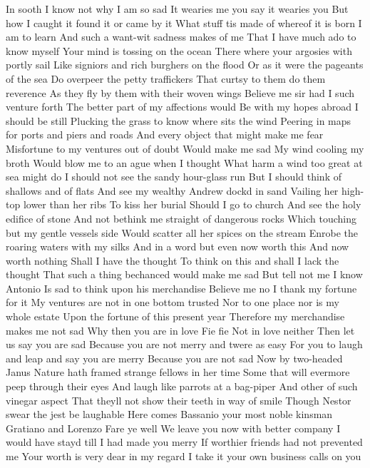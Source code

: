 In sooth I know not why I am so sad 
It wearies me you say it wearies you 
But how I caught it found it or came by it 
What stuff tis made of whereof it is born 
I am to learn 
And such a want-wit sadness makes of me 
That I have much ado to know myself 
Your mind is tossing on the ocean 
There where your argosies with portly sail 
Like signiors and rich burghers on the flood 
Or as it were the pageants of the sea 
Do overpeer the petty traffickers 
That curtsy to them do them reverence 
As they fly by them with their woven wings 
Believe me sir had I such venture forth 
The better part of my affections would 
Be with my hopes abroad I should be still 
Plucking the grass to know where sits the wind 
Peering in maps for ports and piers and roads 
And every object that might make me fear 
Misfortune to my ventures out of doubt 
Would make me sad 
My wind cooling my broth 
Would blow me to an ague when I thought 
What harm a wind too great at sea might do 
I should not see the sandy hour-glass run 
But I should think of shallows and of flats 
And see my wealthy Andrew dockd in sand 
Vailing her high-top lower than her ribs 
To kiss her burial Should I go to church 
And see the holy edifice of stone 
And not bethink me straight of dangerous rocks 
Which touching but my gentle vessels side 
Would scatter all her spices on the stream 
Enrobe the roaring waters with my silks 
And in a word but even now worth this 
And now worth nothing Shall I have the thought 
To think on this and shall I lack the thought 
That such a thing bechanced would make me sad 
But tell not me I know Antonio 
Is sad to think upon his merchandise 
Believe me no I thank my fortune for it 
My ventures are not in one bottom trusted 
Nor to one place nor is my whole estate 
Upon the fortune of this present year 
Therefore my merchandise makes me not sad 
Why then you are in love 
Fie fie 
Not in love neither Then let us say you are sad 
Because you are not merry and twere as easy 
For you to laugh and leap and say you are merry 
Because you are not sad Now by two-headed Janus 
Nature hath framed strange fellows in her time 
Some that will evermore peep through their eyes 
And laugh like parrots at a bag-piper 
And other of such vinegar aspect 
That theyll not show their teeth in way of smile 
Though Nestor swear the jest be laughable 
Here comes Bassanio your most noble kinsman 
Gratiano and Lorenzo Fare ye well 
We leave you now with better company 
I would have stayd till I had made you merry 
If worthier friends had not prevented me 
Your worth is very dear in my regard 
I take it your own business calls on you 
